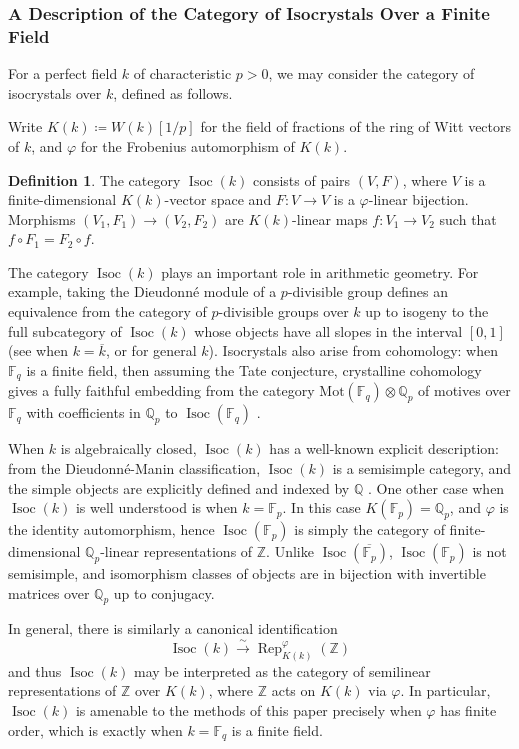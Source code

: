 \documentclass[10pt, reqno, hidelinks]{amsart}
\DeclareMathOperator{\Isoc}{Isoc}
\DeclareMathOperator{\Rep}{Rep}
\newcommand{\bF}{{\mathbb F}}
\newcommand{\bQ}{{\mathbb Q}}
\newcommand{\bZ}{{\mathbb Z}}
\numberwithin{thm}{subsection}
\theoremstyle{definition}
\newtheorem*{defn*}{Definition}
\begin{document}
\subsubsection*{A Description of the Category of Isocrystals Over a Finite Field}

For a perfect field $k$ of characteristic $p > 0$, we may consider the category of isocrystals over $k$, defined as follows.

Write $K(k) \coloneqq W(k)[1/p]$ for the field of fractions of the ring of Witt vectors of $k$, and $\varphi$ for the Frobenius automorphism of $K(k)$.

\begin{defn*}
The category $\Isoc(k)$ consists of pairs $(V,F)$, where $V$ is a finite-dimensional $K(k)$-vector space and $F \colon V \rightarrow V$ is a $\varphi$-linear bijection. Morphisms $(V_1, F_1) \rightarrow (V_2,F_2)$ are $K(k)$-linear maps $f \colon V_1 \rightarrow V_2$ such that $f \circ F_1 = F_2 \circ f$.
\end{defn*}

The category $\Isoc(k)$ plays an important role in arithmetic geometry. For example, taking the Dieudonn\'{e} module of a $p$-divisible group defines an equivalence from the category of $p$-divisible groups over $k$ up to isogeny to the full subcategory of $\Isoc(k)$ whose objects have all slopes in the interval $[0,1]$ (see \cite{Manin} when $k = \overline{k}$, or \cite{Marrama} for general $k$). Isocrystals also arise from cohomology: when $\bF_q$ is a finite field, then assuming the Tate conjecture, crystalline cohomology gives a fully faithful embedding from the category $\text{Mot}(\bF_q) \otimes \bQ_p$ of motives over $\bF_q$ with coefficients in $\bQ_p$ to $\Isoc(\bF_q)$ \cite[Prop.\ 1.17]{MilMot}.

When $k$ is algebraically closed, $\Isoc(k)$ has a well-known explicit description: from the Dieudonn\'{e}-Manin classification, $\Isoc(k)$ is a semisimple category, and the simple objects are explicitly defined and indexed by $\bQ$ \cite{Manin}. One other case when $\Isoc(k)$ is well understood is when $k = \bF_p$. In this case $K(\bF_p) = \bQ_p$, and $\varphi$ is the identity automorphism, hence $\Isoc(\bF_p)$ is simply the category of finite-dimensional $\bQ_p$-linear representations of $\bZ$. Unlike $\Isoc(\overline{\bF_p})$, $\Isoc(\bF_p)$ is not semisimple, and isomorphism classes of objects are in bijection with invertible matrices over $\bQ_p$ up to conjugacy.

In general, there is similarly a canonical identification
\[
\Isoc(k) \xrightarrow{\sim} \Rep_{K(k)}^{\varphi}(\bZ)
\]
and thus $\Isoc(k)$ may be interpreted as the category of semilinear representations of $\bZ$ over $K(k)$, where $\bZ$ acts on $K(k)$ via $\varphi$. In particular, $\Isoc(k)$ is amenable to the methods of this paper precisely when $\varphi$ has finite order, which is exactly when $k = \bF_q$ is a finite field. 
\end{document}
